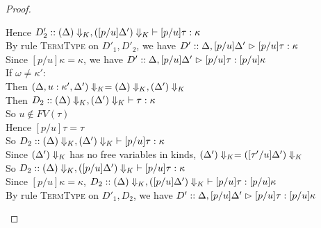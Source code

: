 \begin{proof}
\begin{enumerate}
\begin{itemize}
\begin{tabbedproof}
        \ooooo Hence $D'_2 :: \judgeWK[\restrictkind{\Delta}, \restrictkind{[p/u]\Delta'}]
                                  {[p/u]\tau}{\kappa}$ \\
        \ooooo By rule \textsc{TermType} on $D'_1, D'_2$, we have 
                  $D' :: \judgeA[{\Delta, [p/u]\Delta'}]{[p/u]\tau}{\kappa}$  \\
        \ooooo Since $[p/u]\kappa = \kappa$, we have 
                  $D' :: \judgeA[{\Delta, [p/u]\Delta'}]{[p/u]\tau}{[p/u]\kappa}$ \\
        \oooo If $\omega \not=\kappa'$: \\
        \ooooo Then $\restrictkind{\Delta, u:\kappa', \Delta'} = 
                       \restrictkind{\Delta}, \restrictkind{\Delta'}$ \\
        \ooooo Then $D_2 :: \judgeWK[\restrictkind{\Delta}, \restrictkind{\Delta'}]
                                   {\tau}{\kappa}$ \\
        \ooooo So $u \not \in FV(\tau)$ \\
        \ooooo Hence $[p/u]\tau = \tau$ \\
        \ooooo So $D_2 :: \judgeWK[\restrictkind{\Delta}, \restrictkind{\Delta'}]
                                   {[p/u]\tau}{\kappa}$ \\
        \ooooo Since $\restrictkind{\Delta'}$ has no free variables in kinds, 
                 $\restrictkind{\Delta'} = \restrictkind{[\tau'/u]\Delta'}$ \\
        \ooooo So $D_2 :: \judgeWK[\restrictkind{\Delta}, \restrictkind{[p/u]\Delta'}]
                                   {[p/u]\tau}{\kappa}$ \\
        \ooooo Since $[p/u]\kappa = \kappa$,
               $D_2 :: \judgeWK[\restrictkind{\Delta}, \restrictkind{[p/u]\Delta'}]
                                   {[p/u]\tau}{[p/u]\kappa}$ \\
        \ooooo By rule \textsc{TermType} on $D'_1, D_2$, we have 
                  $D' :: \judgeA[{\Delta, [p/u]\Delta'}]{[p/u]\tau}{[p/u]\kappa}$  \\
      \end{tabbedproof}


\end{itemize}
\end{enumerate}
\end{proof}
